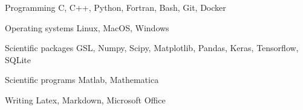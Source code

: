 

\begin{cvskills}

    \cvskill
        {Programming} %
        {C, C++, Python, Fortran, Bash, Git, Docker} %

    \cvskill
        {Operating systems} %
        {Linux, MacOS, Windows} %

    \cvskill
        {Scientific packages} %
        {GSL, Numpy, Scipy, Matplotlib, Pandas, Keras, Tensorflow, SQLite} %

    \cvskill
        {Scientific programs} %
        {Matlab, Mathematica} %


    \cvskill
        {Writing} %
        {Latex, Markdown, Microsoft Office} %

\end{cvskills}